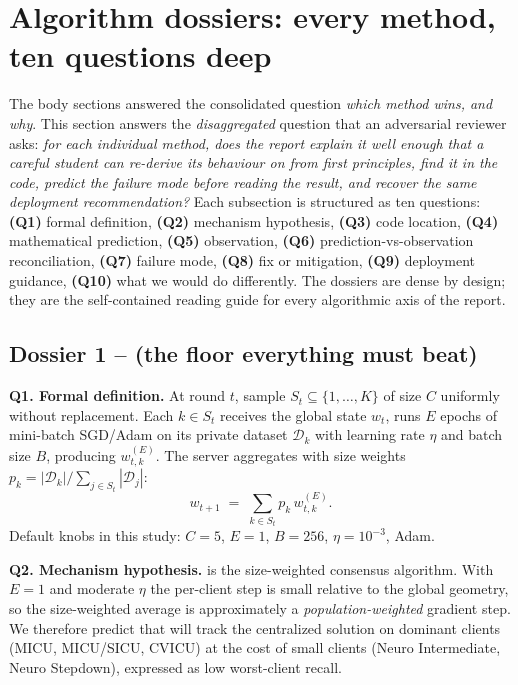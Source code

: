 \section{Algorithm dossiers: every method, ten questions deep}
\label{sec:dossiers}

The body sections answered the consolidated question \emph{which method
wins, and why}. This section answers the \emph{disaggregated} question
that an adversarial reviewer asks: \emph{for each individual method, does
the report explain it well enough that a careful student can re-derive
its behaviour on \mimic{} from first principles, find it in the code,
predict the failure mode before reading the result, and recover the same
deployment recommendation?} Each subsection is structured as ten questions:
\textbf{(Q1)} formal definition, \textbf{(Q2)} mechanism hypothesis,
\textbf{(Q3)} code location, \textbf{(Q4)} mathematical prediction,
\textbf{(Q5)} observation, \textbf{(Q6)} prediction-vs-observation
reconciliation, \textbf{(Q7)} failure mode, \textbf{(Q8)} fix or
mitigation, \textbf{(Q9)} deployment guidance, \textbf{(Q10)} what we
would do differently. The dossiers are dense by design; they are the
self-contained reading guide for every algorithmic axis of the report.

\subsection{Dossier 1 -- \fedavg{} (the floor everything must beat)}
\label{sec:dossier-fedavg}

\textbf{Q1. Formal definition.}
At round $t$, sample $S_t \subseteq \{1,\dots,K\}$ of size $C$ uniformly
without replacement. Each $k \in S_t$ receives the global state $w_t$,
runs $E$ epochs of mini-batch SGD/Adam on its private dataset
$\mathcal{D}_k$ with learning rate $\eta$ and batch size $B$, producing
$w_{t,k}^{(E)}$. The server aggregates with size weights
$p_k = |\mathcal{D}_k| / \sum_{j \in S_t} |\mathcal{D}_j|$:
\[
w_{t+1} \;=\; \sum_{k \in S_t} p_k \, w_{t,k}^{(E)}.
\]
Default knobs in this study: $C\!=\!5$, $E\!=\!1$, $B\!=\!256$,
$\eta\!=\!10^{-3}$, Adam.

\textbf{Q2. Mechanism hypothesis.}
\fedavg{} is the size-weighted consensus algorithm. With $E\!=\!1$ and
moderate $\eta$ the per-client step is small relative to the global
geometry, so the size-weighted average is approximately a
\emph{population-weighted} gradient step. We therefore predict that
\fedavg{} will track the centralized solution on dominant clients
(MICU, MICU/SICU, CVICU) at the cost of small clients (Neuro
Intermediate, Neuro Stepdown), expressed as low worst-client recall.


